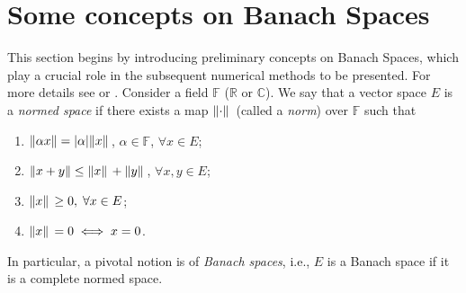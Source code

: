 \label{chap:Preliminaries}
\section{Some concepts on Banach Spaces}
This section begins by introducing preliminary concepts on Banach Spaces, which play a crucial role in the subsequent numerical methods to be presented. For more details see \cite{rudin1991functional} or \cite{brezis2011functional}. Consider a field \(\mathbb{F}\) (\(\mathbb{R}\) or \(\mathbb{C}\)). We say that a vector space \(E\) is a \textit{normed space} if there exists a map \(\norm*{\cdot}\) (called a \textit{norm}) over \(\mathbb{F}\) such that
\begin{enumerate}
    \item \(\norm{\alpha x}= \abs{\alpha}\norm*{x}\), \(\alpha \in \mathbb{F}\), \(\forall x \in E\);
    \item \(\norm{x + y} \leq \norm*{x} + \norm*{y}\), \(\forall x, y \in E\);
    \item \(\norm*{x} \geq 0, \; \forall x \in E\);
    \item \(\norm*{x} = 0 \iff x=0\).
\end{enumerate}
In particular, a pivotal notion is of \textit{Banach spaces}, i.e., \(E\) is a Banach space if it is a complete normed space.
